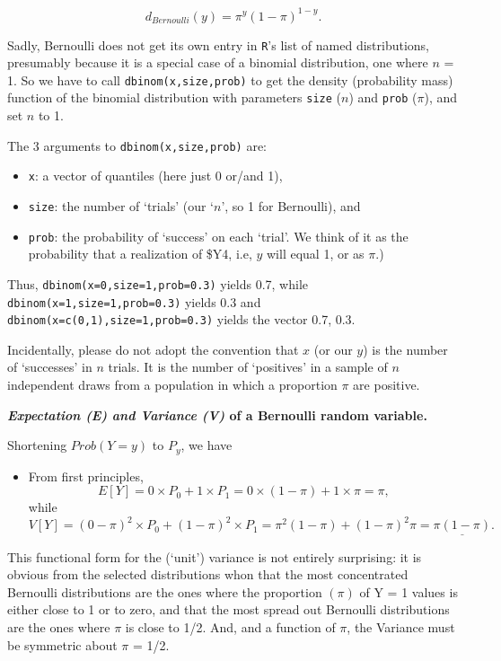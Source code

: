 \documentclass[]{book}
\providecommand{\tightlist}{%
  \setlength{\itemsep}{0pt}\setlength{\parskip}{0pt}}
\begin{document}
\[d_{Bernoulli}(y) = \pi^y (1-\pi)^{1-y}.\]

Sadly, Bernoulli does not get its own entry in \texttt{R}'s list of named distributions, presumably because it is a special case of a binomial distribution, one where \(n\) = 1.
So we have to call \texttt{dbinom(x,size,prob)} to get the
density (probability mass) function of the binomial distribution with parameters \texttt{size} (\(n\)) and \texttt{prob} (\(\pi\)), and set \(n\) to 1.

The 3 arguments to \texttt{dbinom(x,size,prob)} are:

\begin{itemize}
\tightlist
\item
  \texttt{x}: a vector of quantiles (here just 0 or/and 1),
\item
  \texttt{size}: the number of `trials' (our `\(n\)', so 1 for Bernoulli),
  and
\item
  \texttt{prob}: the probability of `success' on each `trial'. We think of it as the probability that a realization of \$Y4, i.e, \(y\) will equal 1, or as \(\pi.\))
\end{itemize}

Thus, \texttt{dbinom(x=0,size=1,prob=0.3)} yields 0.7, while \texttt{dbinom(x=1,size=1,prob=0.3)} yields 0.3 and \texttt{dbinom(x=c(0,1),size=1,prob=0.3)} yields the vector 0.7, 0.3.

Incidentally, please do not adopt the convention that \(x\) (or our \(y\)) is the number of `successes' in \(n\) trials. It is the number of `positives' in a sample of \(n\) independent draws from a population in which a proportion \(\pi\) are positive.

\textbf{\emph{Expectation (E) and Variance (V)} of a Bernoulli random variable.}

Shortening \(Prob(Y=y)\) to \(P_y\), we have

\begin{itemize}
\tightlist
\item
  From first principles,
  \[E[Y] = 0 \times P_0 + 1 \times P_1 = 0 \times (1-\pi) + 1 \times \pi = \pi,\]
  while
  \[V[Y] = (0-\pi)^2 \times P_0 + (1-\pi)^2 \times P_1  = \pi^2(1-\pi) + (1-\pi)^2\pi =  \underline{\pi(1-\pi)}.\]
\end{itemize}

This functional form for the (`unit') variance is not entirely surprising: it is obvious from the selected distributions whon that the most concentrated Bernoulli distributions are the ones where the proportion \((\pi)\) of Y = 1 values is either close to 1 or to zero, and that the most spread out Bernoulli distributions are the ones where \(\pi\) is close to 1/2. And, and a function of \(\pi\), the Variance must be symmetric about \(\pi\) = 1/2.
\end{document}
